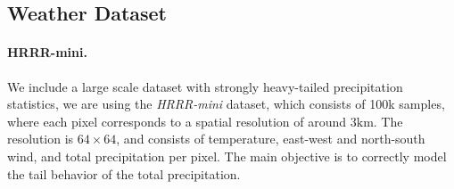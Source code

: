 \documentclass{article}
\theoremstyle{plain}
\theoremstyle{definition}
\theoremstyle{remark}
\begin{document}
\subsection{Weather Dataset}
\paragraph{HRRR-mini.} We include a large scale dataset with strongly heavy-tailed precipitation statistics, we are using the \textit{HRRR-mini} \cite{mardani2024residualcorrectivediffusionmodeling,nvidia_hrrr_mini} dataset, which consists of 100k samples, where each pixel corresponds to a spatial resolution of around $3\text{km}$. The resolution is $64\times 64$, and consists of temperature, east-west and north-south wind, and total precipitation per pixel. The main objective is to correctly model the tail behavior of the total precipitation. 
\end{document}
